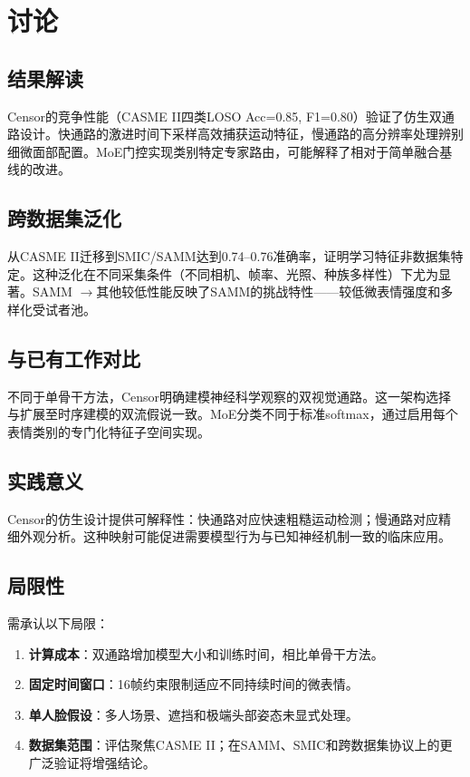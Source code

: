 
\section{讨论}

\subsection{结果解读}

Censor的竞争性能（CASME II四类LOSO Acc=0.85, F1=0.80）验证了仿生双通路设计。快通路的激进时间下采样高效捕获运动特征，慢通路的高分辨率处理辨别细微面部配置。MoE门控实现类别特定专家路由，可能解释了相对于简单融合基线的改进。

\subsection{跨数据集泛化}

从CASME II迁移到SMIC/SAMM达到0.74--0.76准确率，证明学习特征非数据集特定。这种泛化在不同采集条件（不同相机、帧率、光照、种族多样性）下尤为显著。SAMM $\rightarrow$其他较低性能反映了SAMM的挑战特性——较低微表情强度和多样化受试者池。

\subsection{与已有工作对比}

不同于单骨干方法\cite{ben2022survey}，Censor明确建模神经科学观察的双视觉通路\cite{morris1999amygdala,kanwisher1997ffa}。这一架构选择与扩展至时序建模的双流假说\cite{simonyan2014twostream}一致。MoE分类不同于标准softmax，通过启用每个表情类别的专门化特征子空间实现。

\subsection{实践意义}

Censor的仿生设计提供可解释性：快通路对应快速粗糙运动检测；慢通路对应精细外观分析。这种映射可能促进需要模型行为与已知神经机制一致的临床应用。

\subsection{局限性}

需承认以下局限：
\begin{enumerate}
\item \textbf{计算成本}：双通路增加模型大小和训练时间，相比单骨干方法。
\item \textbf{固定时间窗口}：16帧约束限制适应不同持续时间的微表情。
\item \textbf{单人脸假设}：多人场景、遮挡和极端头部姿态未显式处理。
\item \textbf{数据集范围}：评估聚焦CASME II；在SAMM、SMIC和跨数据集协议上的更广泛验证将增强结论。
\end{enumerate}